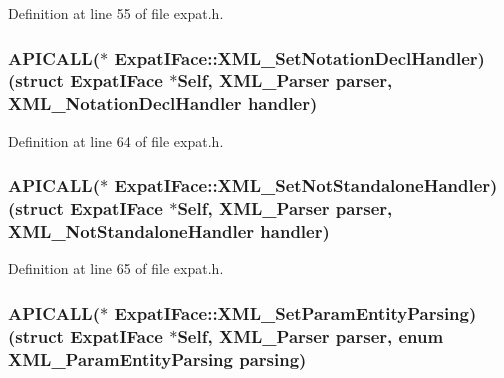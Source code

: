 Definition at line 55 of file expat.\+h.

\subsubsection[{\texorpdfstring{X\+M\+L\+\_\+\+Set\+Notation\+Decl\+Handler}{XML_SetNotationDeclHandler}}]{ A\+P\+I\+C\+A\+LL($\ast$ Expat\+I\+Face\+::\+X\+M\+L\+\_\+\+Set\+Notation\+Decl\+Handler) (struct {\bf Expat\+I\+Face} $\ast$Self, {\bf X\+M\+L\+\_\+\+Parser} parser, {\bf X\+M\+L\+\_\+\+Notation\+Decl\+Handler} handler)}\hypertarget{struct_expat_i_face_a1a9c4d792521ede5a4e2ae7ee89c6617}{}\label{struct_expat_i_face_a1a9c4d792521ede5a4e2ae7ee89c6617}


Definition at line 64 of file expat.\+h.

\subsubsection[{\texorpdfstring{X\+M\+L\+\_\+\+Set\+Not\+Standalone\+Handler}{XML_SetNotStandaloneHandler}}]{ A\+P\+I\+C\+A\+LL($\ast$ Expat\+I\+Face\+::\+X\+M\+L\+\_\+\+Set\+Not\+Standalone\+Handler) (struct {\bf Expat\+I\+Face} $\ast$Self, {\bf X\+M\+L\+\_\+\+Parser} parser, {\bf X\+M\+L\+\_\+\+Not\+Standalone\+Handler} handler)}\hypertarget{struct_expat_i_face_a237a96b29a1e55836f02bcccfc5b3666}{}\label{struct_expat_i_face_a237a96b29a1e55836f02bcccfc5b3666}


Definition at line 65 of file expat.\+h.

\subsubsection[{\texorpdfstring{X\+M\+L\+\_\+\+Set\+Param\+Entity\+Parsing}{XML_SetParamEntityParsing}}]{ A\+P\+I\+C\+A\+LL($\ast$ Expat\+I\+Face\+::\+X\+M\+L\+\_\+\+Set\+Param\+Entity\+Parsing) (struct {\bf Expat\+I\+Face} $\ast$Self, {\bf X\+M\+L\+\_\+\+Parser} parser, enum {\bf X\+M\+L\+\_\+\+Param\+Entity\+Parsing} parsing)}\hypertarget{struct_expat_i_face_a948e23be16ea247e2f0f0b5c095b96d4}{}\label{struct_expat_i_face_a948e23be16ea247e2f0f0b5c095b96d4}


